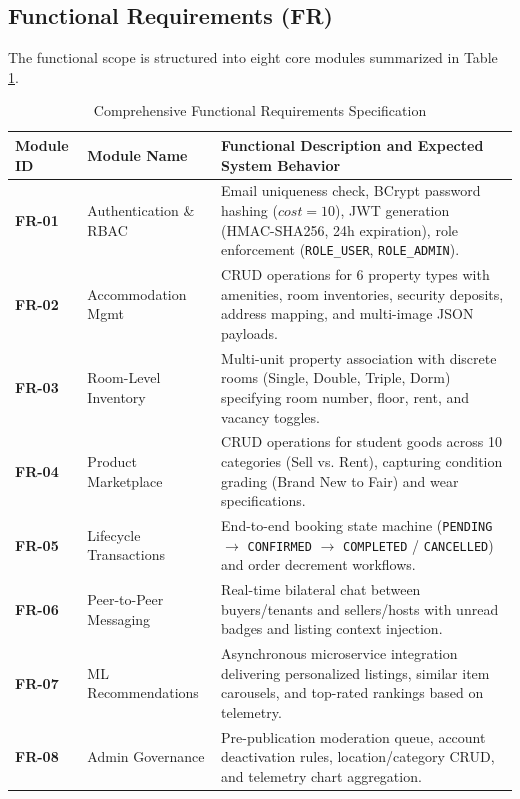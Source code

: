 \subsection{Functional Requirements (FR)}
The functional scope is structured into eight core modules summarized in Table \ref{tab:functional_reqs}.

\begin{table}[htbp]
\centering
\caption{Comprehensive Functional Requirements Specification}
\label{tab:functional_reqs}
\footnotesize
\begin{tabularx}{\textwidth}{lp{3.8cm}X}
\toprule
\textbf{Module ID} & \textbf{Module Name} & \textbf{Functional Description and Expected System Behavior} \\
\midrule
\textbf{FR-01} & Authentication \& RBAC & Email uniqueness check, BCrypt password hashing ($cost=10$), JWT generation (HMAC-SHA256, 24h expiration), role enforcement (\texttt{ROLE\_USER}, \texttt{ROLE\_ADMIN}). \\
\textbf{FR-02} & Accommodation Mgmt & CRUD operations for 6 property types with amenities, room inventories, security deposits, address mapping, and multi-image JSON payloads. \\
\textbf{FR-03} & Room-Level Inventory & Multi-unit property association with discrete rooms (Single, Double, Triple, Dorm) specifying room number, floor, rent, and vacancy toggles. \\
\textbf{FR-04} & Product Marketplace & CRUD operations for student goods across 10 categories (Sell vs. Rent), capturing condition grading (Brand New to Fair) and wear specifications. \\
\textbf{FR-05} & Lifecycle Transactions & End-to-end booking state machine (\texttt{PENDING} $\rightarrow$ \texttt{CONFIRMED} $\rightarrow$ \texttt{COMPLETED} / \texttt{CANCELLED}) and order decrement workflows. \\
\textbf{FR-06} & Peer-to-Peer Messaging & Real-time bilateral chat between buyers/tenants and sellers/hosts with unread badges and listing context injection. \\
\textbf{FR-07} & ML Recommendations & Asynchronous microservice integration delivering personalized listings, similar item carousels, and top-rated rankings based on telemetry. \\
\textbf{FR-08} & Admin Governance & Pre-publication moderation queue, account deactivation rules, location/category CRUD, and telemetry chart aggregation. \\
\bottomrule
\end{tabularx}
\end{table}


